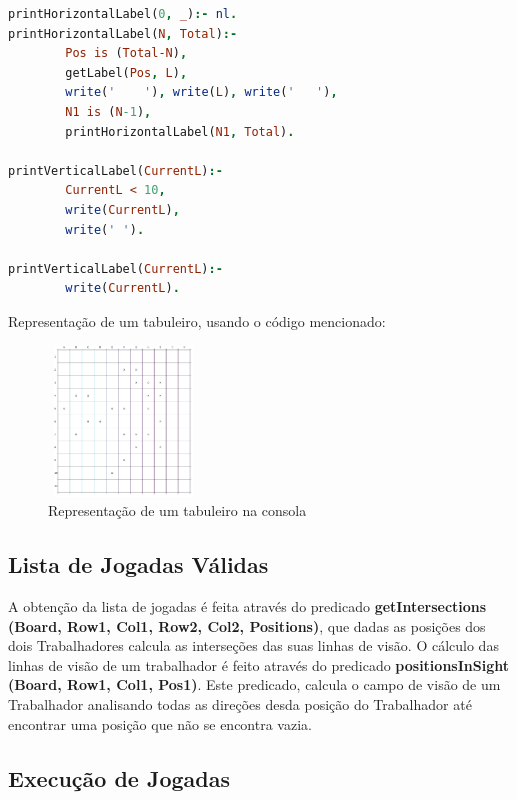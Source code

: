 \documentclass[a4paper]{article}
\begin{document}
\begin{lstlisting}[language=prolog]
printHorizontalLabel(0, _):- nl.
printHorizontalLabel(N, Total):-
        Pos is (Total-N),
        getLabel(Pos, L),
        write('    '), write(L), write('   '),
        N1 is (N-1),
        printHorizontalLabel(N1, Total).        

printVerticalLabel(CurrentL):-
        CurrentL < 10,
        write(CurrentL),
        write(' ').

printVerticalLabel(CurrentL):-
        write(CurrentL).

\end{lstlisting}

\newpage

Representação de um tabuleiro, usando o código mencionado:\newline

\begin{figure}[h!]
\begin{center}
	\includegraphics[height=4cm, width=4cm]{images/self_semi_board.png}
	\caption{Representação de um tabuleiro na consola}
	\label{Figura 9}
\end{center}
\end{figure}

\newpage

\subsection{Lista de Jogadas Válidas}

A obtenção da lista de jogadas é feita através do predicado \textbf{getIntersections (Board, Row1, Col1, Row2, Col2, Positions)}, que dadas as posições dos dois Trabalhadores calcula as interseções das suas linhas de visão. O cálculo das linhas de visão de um trabalhador é feito através do predicado \textbf{positionsInSight (Board, Row1, Col1, Pos1)}. Este predicado, calcula o campo de visão de um Trabalhador analisando todas as direções desda posição do Trabalhador até encontrar uma posição que não se encontra vazia.

\newpage

\subsection{Execução de Jogadas}
\end{document}
